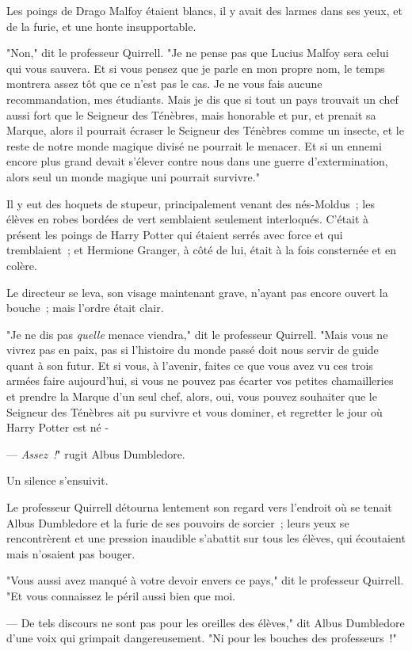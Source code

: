 Les poings de Drago Malfoy étaient blancs, il y avait des larmes dans ses yeux, et de la furie, et une honte insupportable.

"Non," dit le professeur Quirrell. "Je ne pense pas que Lucius Malfoy sera celui qui vous sauvera. Et si vous pensez que je parle en mon propre nom, le temps montrera assez tôt que ce n'est pas le cas. Je ne vous fais aucune recommandation, mes étudiants. Mais je dis que si tout un pays trouvait un chef aussi fort que le Seigneur des Ténèbres, mais honorable et pur, et prenait sa Marque, alors il pourrait écraser le Seigneur des Ténèbres comme un insecte, et le reste de notre monde magique divisé ne pourrait le menacer. Et si un ennemi encore plus grand devait s'élever contre nous dans une guerre d'extermination, alors seul un monde magique uni pourrait survivre."

Il y eut des hoquets de stupeur, principalement venant des nés-Moldus~; les élèves en robes bordées de vert semblaient seulement interloqués. C'était à présent les poings de Harry Potter qui étaient serrés avec force et qui tremblaient~; et Hermione Granger, à côté de lui, était à la fois consternée et en colère.

Le directeur se leva, son visage maintenant grave, n'ayant pas encore ouvert la bouche~; mais l'ordre était clair.

"Je ne dis pas \emph{quelle} menace viendra," dit le professeur Quirrell. "Mais vous ne vivrez pas en paix, pas si l'histoire du monde passé doit nous servir de guide quant à son futur. Et si vous, à l'avenir, faites ce que vous avez vu ces trois armées faire aujourd'hui, si vous ne pouvez pas écarter vos petites chamailleries et prendre la Marque d'un seul chef, alors, oui, vous pouvez souhaiter que le Seigneur des Ténèbres ait pu survivre et vous dominer, et regretter le jour où Harry Potter est né -

--- \emph{Assez~!}" rugit Albus Dumbledore.

Un silence s'ensuivit.

Le professeur Quirrell détourna lentement son regard vers l'endroit où se tenait Albus Dumbledore et la furie de ses pouvoirs de sorcier~; leurs yeux se rencontrèrent et une pression inaudible s'abattit sur tous les élèves, qui écoutaient mais n'osaient pas bouger.

"Vous aussi avez manqué à votre devoir envers ce pays," dit le professeur Quirrell. "Et vous connaissez le péril aussi bien que moi.

--- De tels discours ne sont pas pour les oreilles des élèves," dit Albus Dumbledore d'une voix qui grimpait dangereusement. "Ni pour les bouches des professeurs~!"

